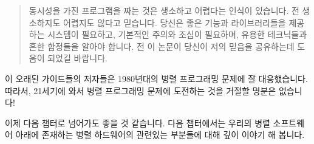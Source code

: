 \begin{quote}
	동시성을 가진 프로그램을 짜는 것은 생소하고 어렵다는 인식이 있습니다.
	전 생소하지도 어렵지도 않다고 믿습니다.
	당신은 좋은 기능과 라이브러리들을 제공하는 시스템이 필요하고, 기본적인
	주의와 조심이 필요하며, 유용한 테크닉들과 흔한 함정들을 알아야 합니다.
	전 이 논문이 당신이 저의 믿음을 공유하는데 도움이 되었길 바랍니다.

\end{quote}

이 오래된 가이드들의 저자들은 1980년대의 병렬 프로그래밍 문제에 잘
대응했습니다.
따라서, 21세기에 와서 병렬 프로그래밍 문제에 도전하는 것을 거절할 명분은
없습니다!

이제 다음 챕터로 넘어가도 좋을 것 같습니다. 다음 챕터에서는 우리의 병렬
소프트웨어 아래에 존재하는 병렬 하드웨어의 관련있는 부분들에 대해 깊이 이야기
해 봅니다.

